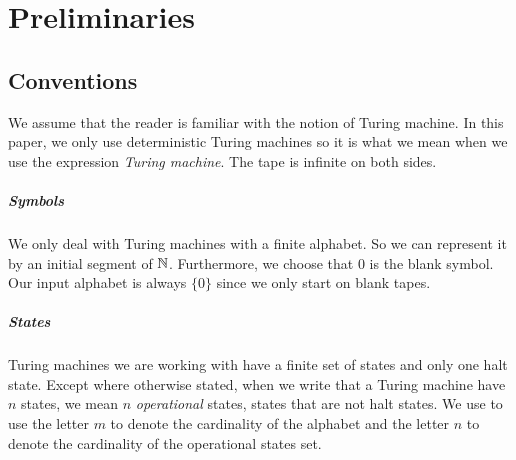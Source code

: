 \documentclass{report}
\begin{document}



\chapter{Preliminaries}
\label{chap:pre}

\section{Conventions}

We assume that the reader is familiar with the notion of Turing machine. In this paper, we only use deterministic Turing machines so it is what we mean when we use the expression \emph{Turing machine}. The tape is infinite on both sides.

\paragraph{Symbols}
We only deal with Turing machines with a finite alphabet. So we can represent it by an initial segment of $\mathbb{N}$. Furthermore, we choose that $0$ is the blank symbol. Our input alphabet is always $\{0\}$ since we only start on blank tapes. 

\paragraph{States}
Turing machines we are working with have a finite set of states and only one halt state.
 Except where otherwise stated, when we write that a Turing machine have $n$ states, we mean $n$ \emph{operational} states, \ie states that are not halt states. We use to use the letter $m$ to denote the cardinality of the alphabet and the letter $n$ to denote the cardinality of the operational states set.
\end{document}
